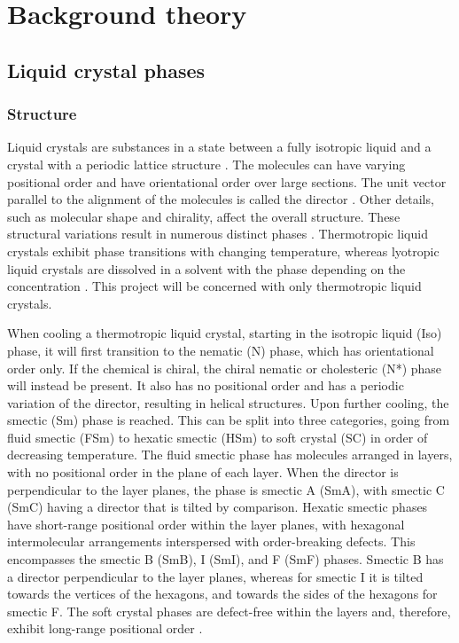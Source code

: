 \documentclass[12pt]{article}
\begin{document}
\section{Background theory}
\subsection{Liquid crystal phases}
\subsubsection{Structure}
Liquid crystals are substances in a state between a fully isotropic liquid and a crystal with a periodic lattice structure \cite{Demus99, Dierking03}. The molecules can have varying positional order and have orientational order over large sections. The unit vector parallel to the alignment of the molecules is called the director \cite{Demus99, Dierking03}. Other details, such as molecular shape and chirality, affect the overall structure. These structural variations result in numerous distinct phases \cite{Demus99, Dierking03}. Thermotropic liquid crystals exhibit phase transitions with changing temperature, whereas lyotropic liquid crystals are dissolved in a solvent with the phase depending on the concentration \cite{Demus99}. This project will be concerned with only thermotropic liquid crystals. 

When cooling a thermotropic liquid crystal, starting in the isotropic liquid (Iso) phase, it will first transition to the nematic (N) phase, which has orientational order only. If the chemical is chiral, the chiral nematic or cholesteric (N*) phase will instead be present. It also has no positional order and has a periodic variation of the director, resulting in helical structures. Upon further cooling, the smectic (Sm) phase is reached. This can be split into three categories, going from fluid smectic (FSm) to hexatic smectic (HSm) to soft crystal (SC) in order of decreasing temperature. The fluid smectic phase has molecules arranged in layers, with no positional order in the plane of each layer. When the director is perpendicular to the layer planes, the phase is smectic A (SmA), with smectic C (SmC) having a director that is tilted by comparison. Hexatic smectic phases have short-range positional order within the layer planes, with hexagonal intermolecular arrangements interspersed with order-breaking defects. This encompasses the smectic B (SmB), I (SmI), and F (SmF) phases. Smectic B has a director perpendicular to the layer planes, whereas for smectic I it is tilted towards the vertices of the hexagons, and towards the sides of the hexagons for smectic F. The soft crystal phases are defect-free within the layers and, therefore, exhibit long-range positional order \cite{Dierking03}.
\end{document}
